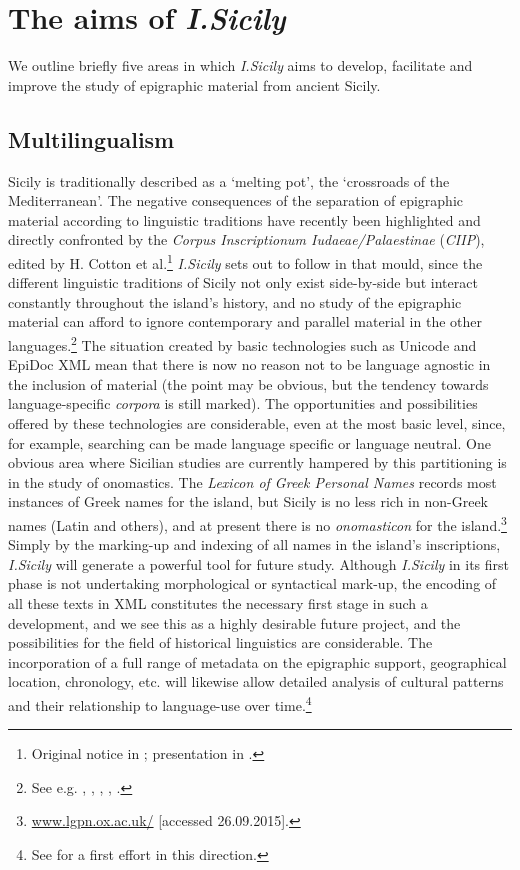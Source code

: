 \documentclass[amsthm,ebook]{saparticle}
\begin{document}
\section{The aims of \emph{I.Sicily}}
\noindent We outline briefly five areas in which \emph{I.Sicily} aims to develop, facilitate and improve the study of epigraphic material
from ancient Sicily.




\subsection{Multilingualism}


\noindent Sicily is traditionally described as a `melting pot', the `crossroads of the Mediterranean'. The negative consequences
of the separation of epigraphic material according to linguistic traditions have recently been highlighted and directly
confronted by the \emph{Corpus Inscriptionum Iudaeae/Palaestinae} (\emph{CIIP}), edited by H. Cotton et al.\footnote{ Original notice
in \citet{cotton_corpus_1999}; presentation in \citet{Cotton:2007aa}.} \emph{I.Sicily} sets out to follow in that mould, since the
different linguistic traditions of Sicily not only exist side-by-side but interact constantly throughout the island’s
history, and no study of the epigraphic material can afford to ignore contemporary and parallel material in the other
languages.\footnote{ See e.g. \citet{manganaro_greco_1993}, \citet{prag_epigraphy_2002}, \citet{salmeri_i_2004}, \citet{korhonen_language_2011}, \citet{tribulato_language_2012}.} The situation
created by basic technologies such as Unicode and EpiDoc XML mean that there is now no reason not to be language
agnostic in the inclusion of material (the point may be obvious, but the tendency towards language-specific \emph{corpora} is
still marked). The opportunities and possibilities offered by these technologies are considerable, even at the most
basic level, since, for example, searching can be made language specific or language neutral. One obvious area where
Sicilian studies are currently hampered by this partitioning is in the study of onomastics. The \emph{Lexicon of Greek
Personal Names} records most instances of Greek names for the island, but Sicily is no less rich in non-Greek names
(Latin and others), and at present there is no \emph{onomasticon} for the island.\footnote{ \url{www.lgpn.ox.ac.uk/} [accessed
26.09.2015].} Simply by the marking-up and indexing of all names in the island’s inscriptions, \emph{I.Sicily} will generate a
powerful tool for future study. Although \emph{I.Sicily} in its first phase is not undertaking morphological or syntactical
mark-up, the encoding of all these texts in XML constitutes the necessary first stage in such a development, and we see
this as a highly desirable future project, and the possibilities for the field of historical linguistics are
considerable. The incorporation of a full range of metadata on the epigraphic support, geographical location,
chronology, etc. will likewise allow detailed analysis of cultural patterns and their relationship to language-use over
time.\footnote{ See \citet{prag_epigraphy_2002} for a first effort in this direction.}
\end{document}
